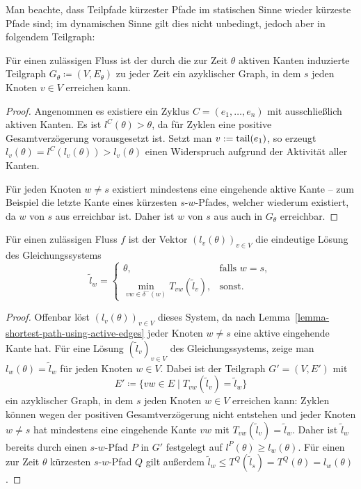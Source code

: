 Man beachte, dass Teilpfade kürzester Pfade im statischen Sinne wieder kürzeste Pfade sind; im dynamischen Sinne gilt dies nicht unbedingt, jedoch aber in folgendem Teilgraph:

\begin{lemma}\label{lemma-shortest-path-using-active-edges}
	Für einen zulässigen Fluss ist der durch die zur Zeit $\theta$ aktiven Kanten induzierte Teilgraph $G_\theta\coloneq (V, E_\theta)$ zu jeder Zeit ein azyklischer Graph, in dem $s$ jeden Knoten $v\in V$ erreichen kann.
\end{lemma}
\begin{proof}
	Angenommen es existiere ein Zyklus $C=(e_1, \dots, e_n)$ mit ausschließlich aktiven Kanten.
	Es ist $l^C(\theta) > \theta$, da für Zyklen eine positive Gesamtverzögerung vorausgesetzt ist.
	Setzt man $v:= \operatorname{tail}(e_1)$, so erzeugt $l_{v}(\theta) = l^C(l_{v}(\theta)) > l_{v}(\theta)$ einen Widerspruch aufgrund der Aktivität aller Kanten.
	
	Für jeden Knoten $w\neq s$ existiert mindestens eine eingehende aktive Kante -- zum Beispiel die letzte Kante eines kürzesten $s$-$w$-Pfades, welcher wiederum existiert, da $w$ von $s$ aus erreichbar ist.
	Daher ist $w$ von $s$ aus auch in $G_\theta$ erreichbar.
\end{proof}

\begin{proposition}\label{prop-arrival-times-vector}
	Für einen zulässigen Fluss $f$ ist der Vektor $(l_v(\theta))_{v\in V}$ die eindeutige Lösung des Gleichungssystems
	\[ \tilde{l}_w = \begin{cases}
	\theta, & \text{falls } w=s, \\
	\min\limits_{vw\in \delta^-(w)} T_{vw}(\tilde{l}_v), & \text{sonst}.
	\end{cases} \]
\end{proposition}
\begin{proof}
	Offenbar löst $(l_v(\theta))_{v\in V}$ dieses System, da nach Lemma~\ref{lemma-shortest-path-using-active-edges} jeder Knoten $w\neq s$ eine aktive eingehende Kante hat.
	Für eine Lösung $(\tilde{l}_v)_{v\in V}$ des Gleichungssystems, zeige man $l_w(\theta) = \tilde{l}_w$ für jeden Knoten $w\in V$.
	Dabei ist der Teilgraph $G'=(V, E')$ mit
	\[ E' \coloneq  \{ vw \in E \mid T_{vw}(\tilde{l}_v ) = \tilde{l}_w \} \]
	ein azyklischer Graph, in dem $s$ jeden Knoten $w\in V$ erreichen kann:
	Zyklen können wegen der positiven Gesamtverzögerung nicht entstehen und jeder Knoten $w\neq s$ hat mindestens eine eingehende Kante $vw$ mit $T_{vw}(\tilde{l}_v) = \tilde{l}_w$.
	Daher ist $\tilde{l}_w$ bereits durch einen $s$-$w$-Pfad $P$ in $G'$ festgelegt auf $l^P(\theta)\geq l_w(\theta)$.
	Für einen zur Zeit $\theta$ kürzesten $s$-$w$-Pfad $Q$ gilt außerdem $\tilde{l}_w \leq T^Q(\tilde{l}_s) = T^Q(\theta) = l_w(\theta)$.
\end{proof}

